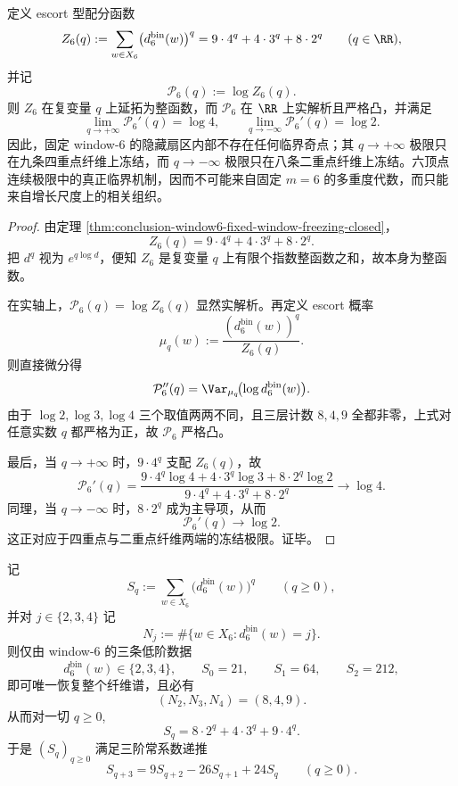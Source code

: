 \begin{proposition}\label{prop:conclusion-window6-fixed-hidden-sector-analytic-triviality}
定义 escort 型配分函数
\[
Z_6(q)
:=
\sum_{w\in X_6}\bigl(d_6^{\mathrm{bin}}(w)\bigr)^q
=
9\cdot 4^q+4\cdot 3^q+8\cdot 2^q
\qquad (q\in\RR),
\]
并记
\[
\mathcal P_6(q):=\log Z_6(q).
\]
则 \(Z_6\) 在复变量 \(q\) 上延拓为整函数，而 \(\mathcal P_6\) 在 \(\RR\) 上实解析且严格凸，并满足
\[
\lim_{q\to+\infty}\mathcal P_6'(q)=\log 4,
\qquad
\lim_{q\to-\infty}\mathcal P_6'(q)=\log 2.
\]
因此，固定 window-\(6\) 的隐藏扇区内部不存在任何临界奇点；其 \(q\to+\infty\) 极限只在九条四重点纤维上冻结，而 \(q\to-\infty\) 极限只在八条二重点纤维上冻结。六顶点连续极限中的真正临界机制，因而不可能来自固定 \(m=6\) 的多重度代数，而只能来自增长尺度上的相关组织。
\end{proposition}
\begin{proof}
由定理 \ref{thm:conclusion-window6-fixed-window-freezing-closed}，
\[
Z_6(q)=9\cdot 4^q+4\cdot 3^q+8\cdot 2^q.
\]
把 \(d^q\) 视为 \(e^{q\log d}\)，便知 \(Z_6\) 是复变量 \(q\) 上有限个指数整函数之和，故本身为整函数。

在实轴上，\(\mathcal P_6(q)=\log Z_6(q)\) 显然实解析。再定义 escort 概率
\[
\mu_q(w):=\frac{(d_6^{\mathrm{bin}}(w))^q}{Z_6(q)}.
\]
则直接微分得
\[
\mathcal P_6''(q)=\Var_{\mu_q}\!\bigl(\log d_6^{\mathrm{bin}}(w)\bigr).
\]
由于 \(\log 2,\log 3,\log 4\) 三个取值两两不同，且三层计数 \(8,4,9\) 全都非零，上式对任意实数 \(q\) 都严格为正，故 \(\mathcal P_6\) 严格凸。

最后，当 \(q\to+\infty\) 时，\(9\cdot 4^q\) 支配 \(Z_6(q)\)，故
\[
\mathcal P_6'(q)
=
\frac{9\cdot 4^q\log 4+4\cdot 3^q\log 3+8\cdot 2^q\log 2}
{9\cdot 4^q+4\cdot 3^q+8\cdot 2^q}
\longrightarrow \log 4.
\]
同理，当 \(q\to-\infty\) 时，\(8\cdot 2^q\) 成为主导项，从而
\[
\mathcal P_6'(q)\longrightarrow \log 2.
\]
这正对应于四重点与二重点纤维两端的冻结极限。证毕。
\end{proof}

\begin{theorem}\label{thm:conclusion-window6-three-low-order-moments-rigidify-full-spectrum}
记
\[
S_q:=\sum_{w\in X_6}\bigl(d_6^{\mathrm{bin}}(w)\bigr)^q
\qquad (q\ge 0),
\]
并对 \(j\in\{2,3,4\}\) 记
\[
N_j:=\#\{w\in X_6:d_6^{\mathrm{bin}}(w)=j\}.
\]
则仅由 window-\(6\) 的三条低阶数据
\[
d_6^{\mathrm{bin}}(w)\in\{2,3,4\},
\qquad
S_0=21,
\qquad
S_1=64,
\qquad
S_2=212,
\]
即可唯一恢复整个纤维谱，且必有
\[
(N_2,N_3,N_4)=(8,4,9).
\]
从而对一切 \(q\ge 0\),
\[
S_q=8\cdot 2^q+4\cdot 3^q+9\cdot 4^q.
\]
于是 \((S_q)_{q\ge 0}\) 满足三阶常系数递推
\[
S_{q+3}=9S_{q+2}-26S_{q+1}+24S_q
\qquad (q\ge 0).
\]
\end{theorem}


